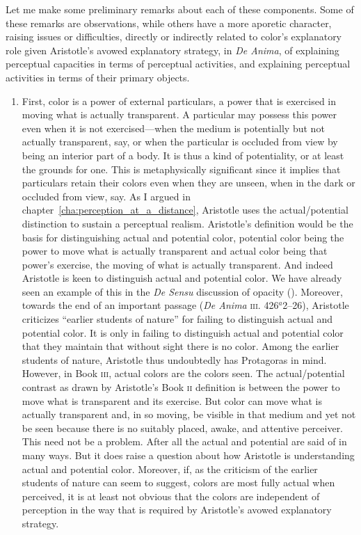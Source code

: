 Let me make some preliminary remarks about each of these components. Some of these remarks are observations, while others have a more aporetic character, raising issues or difficulties, directly or indirectly related to color's explanatory role given Aristotle's avowed explanatory strategy, in \emph{De Anima}, of explaining perceptual capacities in terms of perceptual activities, and explaining perceptual activities in terms of their primary objects.
\begin{enumerate}[(1)]
	\item First, color is a power of external particulars, a power that is exercised in moving what is actually transparent. A particular may possess this power even when it is not exercised---when the medium is potentially but not actually transparent, say, or when the particular is occluded from view by being an interior part of a body. It is thus a kind of potentiality, or at least the grounds for one. This is metaphysically significant since it implies that particulars retain their colors even when they are unseen, when in the dark or occluded from view, say. As I argued in chapter~\ref{cha:perception_at_a_distance}, Aristotle uses the actual/potential distinction to sustain a perceptual realism. Aristotle's definition would be the basis for distinguishing actual and potential color, potential color being the power to move what is actually transparent and actual color being that power's exercise, the moving of what is actually transparent. And indeed Aristotle is keen to distinguish actual and potential color. We have already seen an example of this in the \emph{De Sensu} discussion of opacity (\pageref{actual_potential}). Moreover, towards the end of an important passage (\emph{De Anima} \textsc{iii}. 426\( ^{a} \)2--26), Aristotle criticizes ``earlier students of nature'' for failing to distinguish actual and potential color. It is only in failing to distinguish actual and potential color that they maintain that without sight there is no color. Among the earlier students of nature, Aristotle thus undoubtedly has Protagoras in mind. However, in Book \textsc{iii}, actual colors are the colors seen. The actual/potential contrast as drawn by Aristotle's Book \textsc{ii} definition is between the power to move what is transparent and its exercise. But color can move what is actually transparent and, in so moving, be visible in that medium and yet not be seen because there is no suitably placed, awake, and attentive perceiver. This need not be a problem. After all the actual and potential are said of in many ways. But it does raise a question about how Aristotle is understanding actual and potential color. Moreover, if, as the criticism of the earlier students of nature can seem to suggest, colors are most fully actual when perceived, it is at least not obvious that the colors are independent of perception in the way that is required by Aristotle's avowed explanatory strategy.

\end{enumerate}
